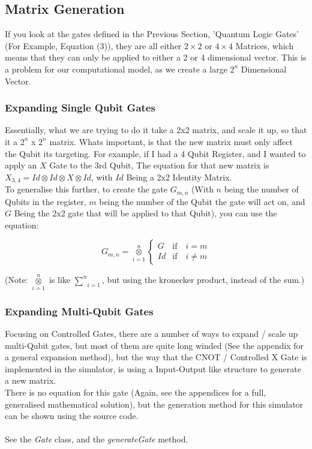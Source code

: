 \documentclass[../main.tex]{subfiles}
\begin{document}
\subsection{Matrix Generation}
If you look at the gates defined in the Previous Section, 'Quantum Logic Gates' (For Example, Equation (3)), they are all either \(2\times2\) or \(4\times4\) Matrices, which means that they can only be applied to either a 2 or 4 dimensional vector. This is a problem for our computational model, as we create a large \(2^n\) Dimensional Vector.

\subsubsection{Expanding Single Qubit Gates}
Essentially, what we are trying to do it take a 2x2 matrix, and scale it up, so that it a \(2^n\) x \(2^n\) matrix. Whats important, is that the new matrix must only affect the Qubit its targeting. For example, if I had a 4 Qubit Register, and I wanted to apply an \(X\) Gate to the 3rd Qubit, The equation for that new matrix is \(X_{3,4} = Id \otimes Id \otimes X \otimes Id \), with \(Id\) Being a 2x2 Identity Matrix. \\
To generalise this further, to create the gate \(G_{m,n}\) (With \(n\) being the number of Qubits in the register, \(m\) being the number of the Qubit the gate will act on, and \(G\) Being the 2x2 gate that will be applied to that Qubit), 
you can use the equation:

\begin{equation}
	G_{m,n} = \underset{i=1}{\overset{n}{\otimes}}
	\begin{cases}
    	G & \text{if} \quad i = m \\
    	Id & \text{if} \quad i \neq m
	\end{cases}
\end{equation}

(Note: \(\underset{i=1}{\overset{n}{\otimes}}\) is like \(\underset{i=1}{\overset{n}{\sum}}\), but using the kronecker product, instead of the sum.)

\subsubsection{Expanding Multi-Qubit Gates}
Focusing on Controlled Gates, there are a number of ways to expand / scale up multi-Qubit gates, but most of them are quite long winded (See the appendix for a general expansion method),
but the way that the CNOT / Controlled X Gate is implemented in the simulator, is using a Input-Output like structure to generate a new matrix. \\
There is no equation for this gate (Again, see the appendices for a full, generalised mathematical solution), but the generation method for this simulator can be shown using the source code. \\ \\ 
See the \emph{Gate} class, and the \emph{generateGate} method.
\end{document}
